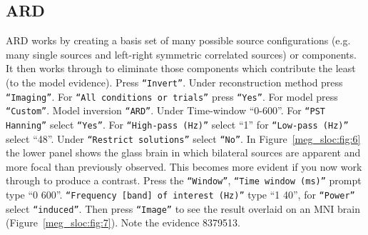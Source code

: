 \subsection{ARD}
ARD works by creating a basis set of many possible source configurations (e.g. many single sources and left-right symmetric correlated sources) or components. It then works through to eliminate those components which contribute the least (to the model evidence).
Press \texttt{``Invert''}. Under reconstruction method press \texttt{``Imaging''}. For \texttt{``All conditions or trials''} press \texttt{``Yes''}. For model press \texttt{``Custom''}. Model inversion \texttt{``ARD''}. Under Time-window ``0-600''. For \texttt{``PST Hanning''} select \texttt{``Yes''}. For \texttt{``High-pass (Hz)''} select ``1'' for \texttt{``Low-pass (Hz)''} select ``48''. Under \texttt{``Restrict solutions''} select \texttt{``No''}.  In Figure~\ref{meg_sloc:fig:6} the lower panel shows the glass brain in which bilateral sources are apparent and more focal than previously observed. This becomes more evident if you now work through to produce a contrast. Press the \texttt{``Window''}, \texttt{``Time window (ms)''} prompt type ``0 600''. \texttt{``Frequency [band] of interest (Hz)''} type ``1 40'', for \texttt{``Power''} select \texttt{``induced''}. Then press \texttt{``Image''} to see the result overlaid on an MNI brain (Figure~\ref{meg_sloc:fig:7}). Note the evidence 8379513.

